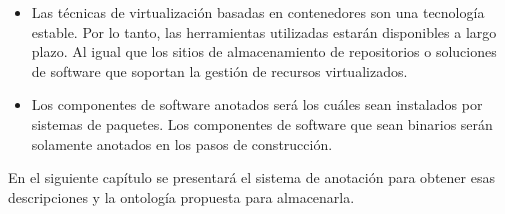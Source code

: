 \begin{itemize}
	\item Las técnicas de virtualización basadas en contenedores son una tecnología estable. Por lo tanto, las herramientas utilizadas estarán disponibles a largo plazo. Al igual que los sitios de almacenamiento de repositorios o soluciones de software que soportan la gestión de recursos virtualizados.
	\item Los componentes de software anotados será los cuáles sean instalados por sistemas de paquetes. Los componentes de software que sean binarios serán solamente anotados en los pasos de construcción. 
\end{itemize}

En el siguiente capítulo se presentará el sistema de anotación para obtener esas descripciones y la ontología propuesta para almacenarla.